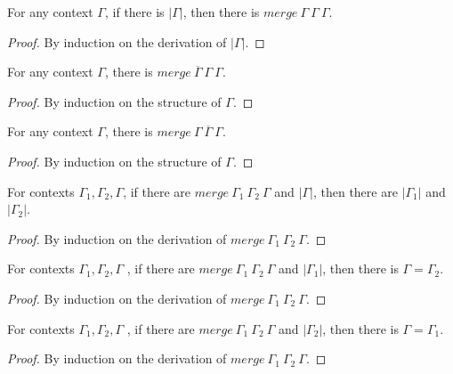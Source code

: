 \documentclass[sigplan,screen,review,anonymous]{acmart}
\newcommand{\pure}[1]{|#1|}
\newcommand{\mrg}[3]{merge\ {#1}\ {#2}\ {#3}}
\begin{document}
\begin{lemma}\label{mergepure}
  For any context $\Gamma$, if there is $\pure{\Gamma}$, then there is $\mrg{\Gamma}{\Gamma}{\Gamma}$.
\end{lemma}
\begin{proof}
  By induction on the derivation of $\pure{\Gamma}$.
\end{proof}

\begin{lemma}\label{mergere1}
  For any context $\Gamma$, there is $\mrg{\overline{\Gamma}}{\Gamma}{\Gamma}$.
\end{lemma}
\begin{proof}
  By induction on the structure of $\Gamma$.
\end{proof}

\begin{lemma}\label{mergere2}
  For any context $\Gamma$, there is $\mrg{\Gamma}{\overline{\Gamma}}{\Gamma}$.
\end{lemma}
\begin{proof}
  By induction on the structure of $\Gamma$.
\end{proof}

\begin{lemma}\label{mergepureinv}
  For contexts $\Gamma_1, \Gamma_2, \Gamma$, if there are $\mrg{\Gamma_1}{\Gamma_2}{\Gamma}$ and $\pure{\Gamma}$, then there are $\pure{\Gamma_1}$ and $\pure{\Gamma_2}$.
\end{lemma}
\begin{proof}
  By induction on the derivation of $\mrg{\Gamma_1}{\Gamma_2}{\Gamma}$.
\end{proof}

\begin{lemma}\label{mergepure1}
  For contexts $\Gamma_1, \Gamma_2, \Gamma$ , if there are $\mrg{\Gamma_1}{\Gamma_2}{\Gamma}$ and $\pure{\Gamma_1}$, then there is $\Gamma = \Gamma_2$.
\end{lemma}
\begin{proof}
  By induction on the derivation of $\mrg{\Gamma_1}{\Gamma_2}{\Gamma}$.
\end{proof}

\begin{lemma}\label{mergepure2}
  For contexts $\Gamma_1, \Gamma_2, \Gamma$ , if there are $\mrg{\Gamma_1}{\Gamma_2}{\Gamma}$ and $\pure{\Gamma_2}$, then there is $\Gamma = \Gamma_1$.
\end{lemma}
\begin{proof}
  By induction on the derivation of $\mrg{\Gamma_1}{\Gamma_2}{\Gamma}$.
\end{proof}
\end{document}
